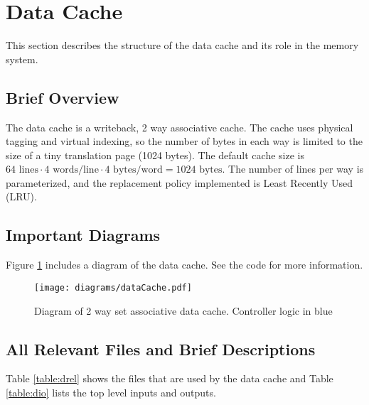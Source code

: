 \section{Data Cache}\label{sec:d-cache}
This section describes the structure of the data cache and its role in the memory system.

\subsection{Brief Overview}

The data cache is a writeback, 2 way associative cache. 
The cache uses physical tagging and virtual indexing, so the number of bytes in each way is limited to the size of a tiny translation page (1024 bytes). 
The default cache size is $64 \text{ lines} \cdot 4 \text{ words/line} \cdot 4 \text{ bytes/word} = 1024 \text{ bytes}$. 
The number of lines per way is parameterized, and the replacement policy implemented is Least Recently Used (LRU).

\subsection{Important Diagrams}

	Figure \ref{fig:dcachediag} includes a diagram of the data cache.
	See the code for more information.
	\begin{figure}
	\label{fig:dcachediag}
	\centering
	\texttt{[image: diagrams/dataCache.pdf]}
	\caption{Diagram of 2 way set associative data cache. Controller logic in blue}
	\end{figure}

\subsection{All Relevant Files and Brief Descriptions}

	Table \ref{table:drel} shows the files that are used by the data cache and Table \ref{table:dio} lists the top level inputs and outputs.


